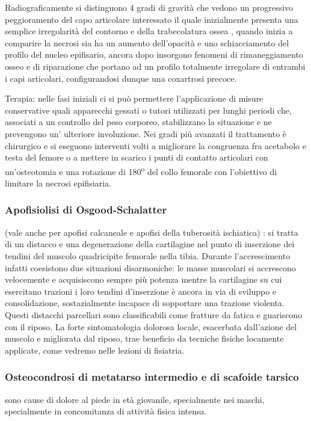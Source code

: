 Radiograficamente si distinguono 4 gradi di gravità che vedono un progressivo peggioramento del capo articolare interessato il quale inizialmente presenta una semplice irregolarità del contorno e della trabecolatura ossea , quando inizia a comparire la necrosi sia ha un aumento dell'opacità e uno schiacciamento del profilo del nucleo
epifisario, ancora dopo insorgono fenomeni di rimaneggiamento osseo e di riparazione che portano ad un profilo totalmente irregolare di entrambi i capi articolari, configurandosi dunque una coxartrosi precoce.

Terapia: nelle fasi iniziali ci si può permettere l'applicazione di misure conservative quali apparecchi gessati o tutori utilizzati per lunghi periodi che, associati a un controllo del peso corporeo, stabilizzano la situazione e ne prevengono un' ulteriore involuzione.
Nei gradi più avanzati il trattamento è chirurgico e si eseguono interventi volti a migliorare la congruenza fra acetabolo e testa del femore o a mettere in scarico i punti di contatto articolari con un'osteotomia e una rotazione di 180\textsuperscript{o} del collo femorale con l'obiettivo di limitare la necrosi epifisiaria.

\subsubsection{Apofisiolisi di Osgood-Schalatter} 
(vale anche per apofisi calcaneale e apofisi della tuberosità ischiatica) : si tratta di un distacco e una degenerazione della cartilagine nel punto di inserzione
dei tendini del muscolo quadricipite femorale nella tibia. Durante l'accrescimento infatti coesistono due situazioni disarmoniche: le masse muscolari si accrescono velocemente e acquisiscono sempre più potenza mentre la cartilagine su cui esercitano trazioni i loro tendini
d'inserzione è ancora in via di sviluppo e consolidazione, sostazialmente incapace di sopportare una trazione violenta. Questi distacchi parcellari sono classificabili come fratture da fatica e guariscono con il riposo. La forte sintomatologia dolorosa locale,
esacerbata dall'azione del muscolo e migliorata dal riposo, trae beneficio da tecniche fisiche locamente applicate, come vedremo nelle lezioni di fisiatria.

\subsubsection{Osteocondrosi di metatarso intermedio e di scafoide tarsico}
sono cause di dolore al piede in età giovanile, specialmente nei maschi, specialmente in concomitanza di attività fisica intensa.

